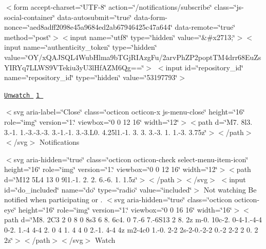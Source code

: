  


\begin{DoxyItemize}
\item $<$form accept-\/charset=\char`\"{}\+U\+T\+F-\/8\char`\"{} action=\char`\"{}/notifications/subscribe\char`\"{} class=\char`\"{}js-\/social-\/container\char`\"{} data-\/autosubmit=\char`\"{}true\char`\"{} data-\/form-\/nonce=\char`\"{}aed8adff2098e45a9684ed2ab67946425c47a644\char`\"{} data-\/remote=\char`\"{}true\char`\"{} method=\char`\"{}post\char`\"{}$>$$<$input name=\char`\"{}utf8\char`\"{} type=\char`\"{}hidden\char`\"{} value=\char`\"{}\&\#x2713;\char`\"{}$>$$<$input name=\char`\"{}authenticity\+\_\+token\char`\"{} type=\char`\"{}hidden\char`\"{} value=\char`\"{}\+O\+Y/x\+Q\+A\+J\+S\+Q\+L4\+Wub\+Hlma9b\+T\+Gj\+R\+I\+Azg\+Fu/2arv\+Ph\+Z\+P2popt\+T\+M4drr68\+Eu\+Zs\+Y\+I\+R\+Yq7\+L\+L\+W\+S9\+V\+Tekiu3y\+U3l\+Hf\+A\+Z\+M6\+Qg==\char`\"{}$>$ $<$input id=\char`\"{}repository\+\_\+id\char`\"{} name=\char`\"{}repository\+\_\+id\char`\"{} type=\char`\"{}hidden\char`\"{} value=\char`\"{}53197793\char`\"{}$>$

 \href{/Tom2656/Scott-Cheg-Project/subscription}{\tt Unwatch  } \href{/Tom2656/Scott-Cheg-Project/watchers}{\tt 1 }

    $<$svg aria-\/label=\char`\"{}\+Close\char`\"{} class=\char`\"{}octicon octicon-\/x js-\/menu-\/close\char`\"{} height=\char`\"{}16\char`\"{} role=\char`\"{}img\char`\"{} version=\char`\"{}1.\char`\"{} viewbox=\char`\"{}0 0 12 16\char`\"{} width=\char`\"{}12\char`\"{}$>$$<$path d=\char`\"{}\+M7. 8l3. 3.-\/1. 1.-\/3.-\/3.-\/3. 3.-\/1.-\/1. 3.-\/3.\+L0. 4.\+25l1.-\/1. 3. 3. 3.-\/3. 1. 1.-\/3. 3.\+75z\char`\"{}$>$$<$/path$>$$<$/svg$>$ Notifications 

 

  $<$svg aria-\/hidden=\char`\"{}true\char`\"{} class=\char`\"{}octicon octicon-\/check select-\/menu-\/item-\/icon\char`\"{} height=\char`\"{}16\char`\"{} role=\char`\"{}img\char`\"{} version=\char`\"{}1.\char`\"{} viewbox=\char`\"{}0 0 12 16\char`\"{} width=\char`\"{}12\char`\"{}$>$$<$path d=\char`\"{}\+M12 5\+L4 13 0 9l1.-\/1. 2. 2. 6.-\/6. 1. 1.\+5z\char`\"{}$>$$<$/path$>$$<$/svg$>$  $<$input id=\char`\"{}do\+\_\+included\char`\"{} name=\char`\"{}do\char`\"{} type=\char`\"{}radio\char`\"{} value=\char`\"{}included\char`\"{}$>$ Not watching Be notified when participating or .  $<$svg aria-\/hidden=\char`\"{}true\char`\"{} class=\char`\"{}octicon octicon-\/eye\char`\"{} height=\char`\"{}16\char`\"{} role=\char`\"{}img\char`\"{} version=\char`\"{}1.\char`\"{} viewbox=\char`\"{}0 0 16 16\char`\"{} width=\char`\"{}16\char`\"{}$>$$<$path d=\char`\"{}\+M8. 2\+C3 2 0 8 0 8s3 6 8. 6c4. 0 7.-\/6 7.-\/6\+S13 2 8. 2z m-\/0. 10c-\/2. 0-\/4-\/1.-\/4-\/4 0-\/2. 1.-\/4 4-\/4 2. 0 4 1. 4 4 0 2.-\/1. 4-\/4 4z m2-\/4c0 1.-\/0. 2-\/2 2s-\/2-\/0.-\/2-\/2 0.-\/2 2-\/2 2 0. 2 2z\char`\"{}$>$$<$/path$>$$<$/svg$>$ Watch   


\end{DoxyItemize}
